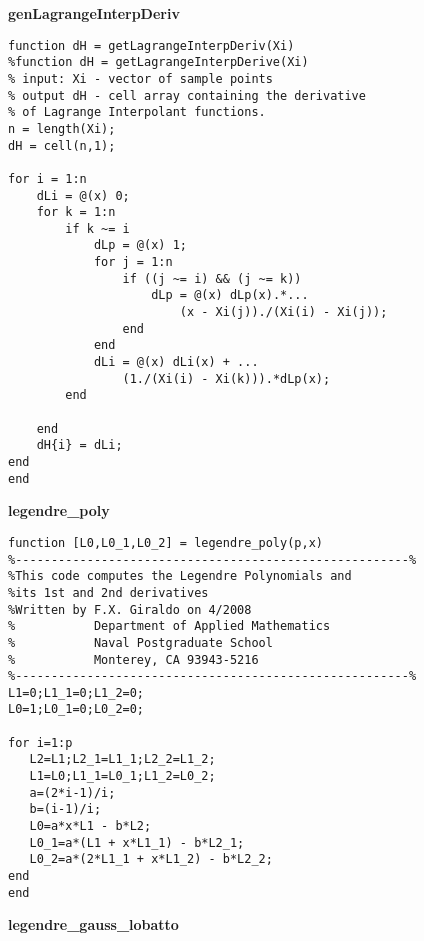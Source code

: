 \vspace{0.5cm}

\noindent\textbf{genLagrangeInterpDeriv}

\begin{lstlisting}[style=myMatlab,name=lec34n-ex2]
function dH = getLagrangeInterpDeriv(Xi)
%function dH = getLagrangeInterpDerive(Xi)
% input: Xi - vector of sample points
% output dH - cell array containing the derivative 
% of Lagrange Interpolant functions.
n = length(Xi);
dH = cell(n,1);

for i = 1:n
    dLi = @(x) 0;
    for k = 1:n
        if k ~= i
            dLp = @(x) 1;
            for j = 1:n
                if ((j ~= i) && (j ~= k))
                    dLp = @(x) dLp(x).*...
                        (x - Xi(j))./(Xi(i) - Xi(j));
                end
            end
            dLi = @(x) dLi(x) + ...
                (1./(Xi(i) - Xi(k))).*dLp(x);
        end
        
    end
    dH{i} = dLi;
end
end
\end{lstlisting}

\vspace{3.5cm}

\noindent\textbf{legendre\_poly}

\begin{lstlisting}[style=myMatlab,name=lec34n-ex2]
function [L0,L0_1,L0_2] = legendre_poly(p,x)
%-------------------------------------------------------%
%This code computes the Legendre Polynomials and 
%its 1st and 2nd derivatives
%Written by F.X. Giraldo on 4/2008
%           Department of Applied Mathematics
%           Naval Postgraduate School 
%           Monterey, CA 93943-5216
%-------------------------------------------------------%
L1=0;L1_1=0;L1_2=0;
L0=1;L0_1=0;L0_2=0;

for i=1:p
   L2=L1;L2_1=L1_1;L2_2=L1_2;
   L1=L0;L1_1=L0_1;L1_2=L0_2;
   a=(2*i-1)/i;
   b=(i-1)/i;
   L0=a*x*L1 - b*L2;
   L0_1=a*(L1 + x*L1_1) - b*L2_1;
   L0_2=a*(2*L1_1 + x*L1_2) - b*L2_2;
end
end
\end{lstlisting}

\vspace{0.5cm}

\noindent\textbf{legendre\_gauss\_lobatto}

